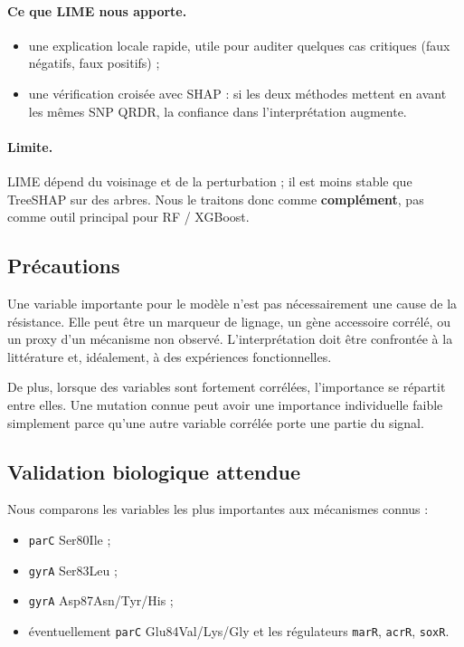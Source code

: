 \documentclass[11pt,a4paper]{article}
\begin{document}
\paragraph{Ce que LIME nous apporte.}
\begin{itemize}[leftmargin=1.2em]
    \item une explication locale rapide, utile pour auditer quelques cas critiques (faux négatifs, faux positifs) ;
    \item une vérification croisée avec SHAP : si les deux méthodes mettent en avant les mêmes SNP QRDR, la confiance dans l'interprétation augmente.
\end{itemize}

\paragraph{Limite.}
LIME dépend du voisinage et de la perturbation ; il est moins stable que TreeSHAP sur des arbres. Nous le traitons donc comme \textbf{complément}, pas comme outil principal pour RF / XGBoost.

\subsection{Précautions}

\begin{warnbox}
Une variable importante pour le modèle n'est pas nécessairement une cause de la résistance. Elle peut être un marqueur de lignage, un gène accessoire corrélé, ou un proxy d'un mécanisme non observé. L'interprétation doit être confrontée à la littérature et, idéalement, à des expériences fonctionnelles.
\end{warnbox}

De plus, lorsque des variables sont fortement corrélées, l'importance se répartit entre elles. Une mutation connue peut avoir une importance individuelle faible simplement parce qu'une autre variable corrélée porte une partie du signal.

\subsection{Validation biologique attendue}

Nous comparons les variables les plus importantes aux mécanismes connus :
\begin{itemize}[leftmargin=1.2em]
    \item \texttt{parC} Ser80Ile ;
    \item \texttt{gyrA} Ser83Leu ;
    \item \texttt{gyrA} Asp87Asn/Tyr/His ;
    \item éventuellement \texttt{parC} Glu84Val/Lys/Gly et les régulateurs \texttt{marR}, \texttt{acrR}, \texttt{soxR}.
\end{itemize}
\end{document}
